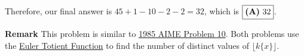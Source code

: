 \begin{enumerate}
 Therefore, our final answer is $45+1-10-2-2=32$, which is $\fbox{\textbf{(A)}\ 32}$.

 \textbf{Remark} This problem is similar to \href{https://artofproblemsolving.com/wiki/index.php/1985\_AIME\_Problems/Problem\_10}{1985 AIME Problem 10}. Both problems use the \href{https://artofproblemsolving.com/wiki/index.php?title=Euler\_Totient\_Function}{Euler Totient Function} to find the number of distinct values of $\lfloor k \{ x \} \rfloor$.

 


\end{enumerate}